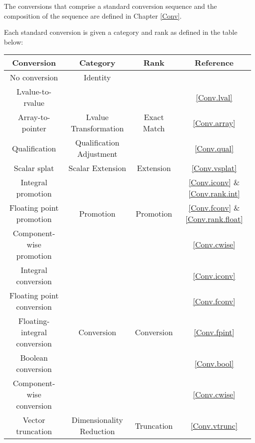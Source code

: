 
\p The conversions that comprise a standard conversion sequence and the
composition of the sequence are defined in Chapter \ref{Conv}.

\p Each standard conversion is given a category and rank as defined in the table
below:
\begin{center}
  \begin{tabular}{|| c | c | c | c ||}
    \hline
    Conversion & Category & Rank & Reference \\
    \hline
    No conversion & Identity &  & \\ \cline{1-2}\cline{4-4}

    Lvalue-to-rvalue & & & \ref{Conv.lval} \\ \cline{4-4}
    Array-to-pointer & Lvalue Transformation & Exact Match
          & \ref{Conv.array} \\ \cline{1-2}\cline{4-4}
    Qualification & Qualification Adjustment & & \ref{Conv.qual} \\ \cline{1-4}

    Scalar splat & Scalar Extension & Extension
          & \ref{Conv.vsplat} \\ \cline{1-4}

    Integral promotion & &
          & \ref{Conv.iconv} \& \ref{Conv.rank.int} \\ \cline{1-1}\cline{4-4}
    Floating point promotion & Promotion & Promotion
          & \ref{Conv.fconv} \& \ref{Conv.rank.float} \\ \cline{1-1}\cline{4-4}
    Component-wise promotion &  &  & \ref{Conv.cwise} \\ \cline{1-4}


    Integral conversion & & & \ref{Conv.iconv} \\ \cline{1-1}\cline{4-4}
    Floating point conversion &  &  & \ref{Conv.fconv} \\ \cline{1-1}\cline{4-4}
    Floating-integral conversion & Conversion & Conversion
          & \ref{Conv.fpint} \\ \cline{1-1}\cline{4-4}
    Boolean conversion &  &  & \ref{Conv.bool} \\ \cline{1-1}\cline{4-4}
    Component-wise conversion &  &  & \ref{Conv.cwise} \\ \cline{1-4}

    Vector truncation & Dimensionality Reduction & Truncation
          & \ref{Conv.vtrunc} \\ \cline{1-4}
    \hline
  \end{tabular}
\end{center}

